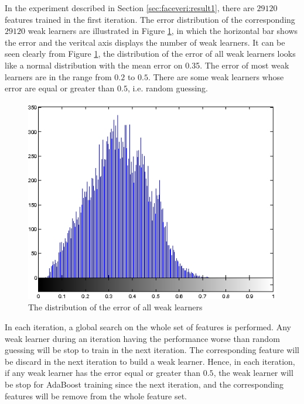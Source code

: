 In the experiment described in \mbox{Section} \ref{sec:faceveri:result1}, there are $29120$ features trained in the first iteration. The error distribution of the corresponding $29120$ weak learners are illustrated in \mbox{Figure} \ref{fig:disterrors}, in which the horizontal bar shows the error and the veritcal axis displays the number of weak learners. It can be seen clearly from  \mbox{Figure} \ref{fig:disterrors}, the distribution of the error of all weak learners looks like a normal distribution with the mean error on 0.35. The error of most weak learners are in the range from $0.2$ to $0.5$. There are some weak learners whose error are equal or greater than $0.5$, i.e. random guessing.
 \begin{figure}
 \begin{center}
   \includegraphics[scale=0.5]{ch4/figures/disterrors.jpg}
  \caption{The distribution of the error of all weak learners}
 \label{fig:disterrors}
 \end{center}
 \end{figure} 
In each iteration, a global search on the whole set of features is performed. Any weak learner during an iteration having the performance worse than random guessing will be stop to train in the next iteration. The corresponding feature will be discard in the next iteration to build a weak learner. Hence, in each iteration, if any weak learner has the error equal or greater than $0.5$, the weak learner will be stop for AdaBoost training since the next iteration, and the corresponding features will be remove from the whole feature set. 

